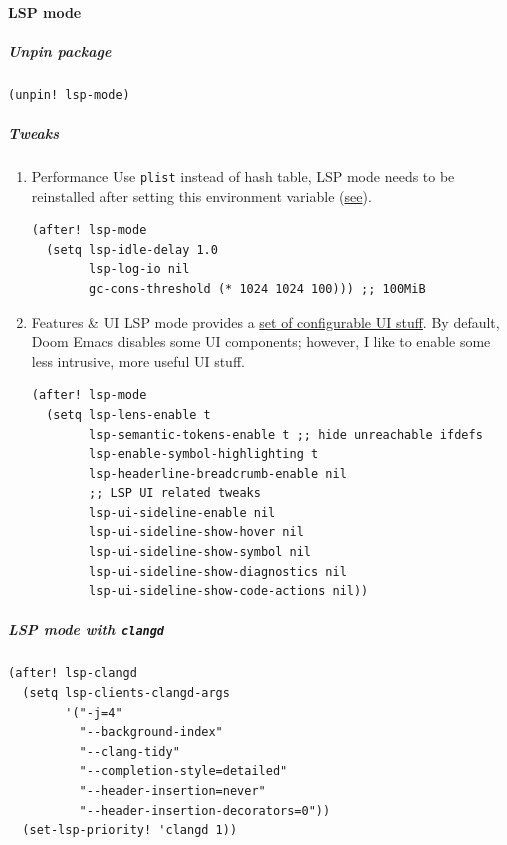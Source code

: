 \documentclass[11pt]{article}
\begin{document}
\paragraph{LSP mode}
\label{sec:orgf8a91d9}
\subparagraph{Unpin package}
\label{sec:org642518f}

\begin{verbatim}
(unpin! lsp-mode)
\end{verbatim}

\subparagraph{Tweaks}
\label{sec:orge10481d}
\begin{enumerate}
\item Performance
\label{sec:org1e5e3d3}
Use \texttt{plist} instead of hash table, LSP mode needs to be reinstalled after setting
this environment variable (\href{https://emacs-lsp.github.io/lsp-mode/page/performance/\#use-plists-for-deserialization}{see}).

\begin{verbatim}
(after! lsp-mode
  (setq lsp-idle-delay 1.0
        lsp-log-io nil
        gc-cons-threshold (* 1024 1024 100))) ;; 100MiB
\end{verbatim}

\item Features \& UI
\label{sec:org07cf25d}
LSP mode provides a \href{https://emacs-lsp.github.io/lsp-mode/tutorials/how-to-turn-off/}{set of configurable UI stuff}. By default, Doom Emacs
disables some UI components; however, I like to enable some less intrusive, more
useful UI stuff.

\begin{verbatim}
(after! lsp-mode
  (setq lsp-lens-enable t
        lsp-semantic-tokens-enable t ;; hide unreachable ifdefs
        lsp-enable-symbol-highlighting t
        lsp-headerline-breadcrumb-enable nil
        ;; LSP UI related tweaks
        lsp-ui-sideline-enable nil
        lsp-ui-sideline-show-hover nil
        lsp-ui-sideline-show-symbol nil
        lsp-ui-sideline-show-diagnostics nil
        lsp-ui-sideline-show-code-actions nil))
\end{verbatim}
\end{enumerate}

\subparagraph{LSP mode with \texttt{clangd}}
\label{sec:org7344c91}

\begin{verbatim}
(after! lsp-clangd
  (setq lsp-clients-clangd-args
        '("-j=4"
          "--background-index"
          "--clang-tidy"
          "--completion-style=detailed"
          "--header-insertion=never"
          "--header-insertion-decorators=0"))
  (set-lsp-priority! 'clangd 1))
\end{verbatim}
\end{document}
